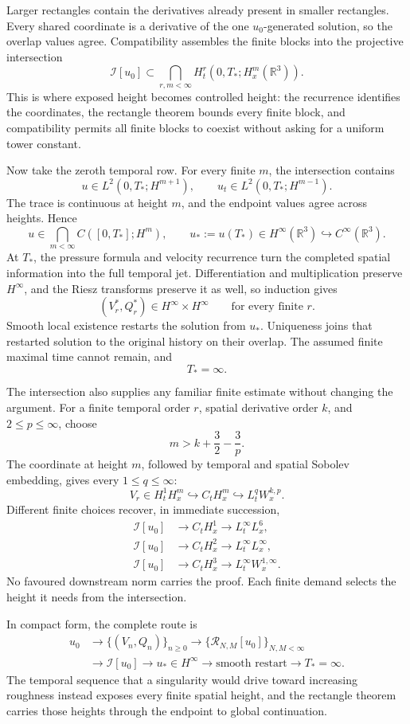 \documentclass[11pt]{article}
\begin{document}
Larger rectangles contain the derivatives already present in smaller rectangles. Every shared coordinate is a derivative of the one \(u_0\)-generated solution, so the overlap values agree. Compatibility assembles the finite blocks into the projective intersection
\[
\mathcal I[u_0]
\subset
\bigcap_{r,m<\infty}
H_t^r(0,T_*;H_x^m(\mathbb R^3)).
\]
This is where exposed height becomes controlled height: the recurrence identifies the coordinates, the rectangle theorem bounds every finite block, and compatibility permits all finite blocks to coexist without asking for a uniform tower constant.

Now take the zeroth temporal row. For every finite \(m\), the intersection contains
\[
u\in L^2(0,T_*;H^{m+1}),
\qquad
u_t\in L^2(0,T_*;H^{m-1}).
\]
The trace is continuous at height \(m\), and the endpoint values agree across heights. Hence
\[
u\in\bigcap_{m<\infty}C([0,T_*];H^m),
\qquad
u_*:=u(T_*)\in H^\infty(\mathbb R^3)
\hookrightarrow C^\infty(\mathbb R^3).
\]
At \(T_*\), the pressure formula and velocity recurrence turn the completed spatial information into the full temporal jet. Differentiation and multiplication preserve \(H^\infty\), and the Riesz transforms preserve it as well, so induction gives
\[
(V_r^*,Q_r^*)\in H^\infty\times H^\infty
\qquad
\text{for every finite }r.
\]
Smooth local existence restarts the solution from \(u_*\). Uniqueness joins that restarted solution to the original history on their overlap. The assumed finite maximal time cannot remain, and
\[
T_*=\infty.
\]

The intersection also supplies any familiar finite estimate without changing the argument. For a finite temporal order \(r\), spatial derivative order \(k\), and \(2\le p\le\infty\), choose
\[
m>k+\frac32-\frac3p.
\]
The coordinate at height \(m\), followed by temporal and spatial Sobolev embedding, gives every \(1\le q\le\infty\):
\[
V_r\in H_t^1H_x^m
\hookrightarrow C_tH_x^m
\hookrightarrow L_t^qW_x^{k,p}.
\]
Different finite choices recover, in immediate succession,
\[
\begin{aligned}
\mathcal I[u_0]&\longrightarrow C_tH_x^1
\longrightarrow L_t^\infty L_x^6,\\
\mathcal I[u_0]&\longrightarrow C_tH_x^2
\longrightarrow L_t^\infty L_x^\infty,\\
\mathcal I[u_0]&\longrightarrow C_tH_x^3
\longrightarrow L_t^\infty W_x^{1,\infty}.
\end{aligned}
\]
No favoured downstream norm carries the proof. Each finite demand selects the height it needs from the intersection.

In compact form, the complete route is
\[
\begin{aligned}
u_0
&\longrightarrow \{(V_n,Q_n)\}_{n\ge0}
\longrightarrow \{\mathcal R_{N,M}[u_0]\}_{N,M<\infty}\\
&\longrightarrow \mathcal I[u_0]
\longrightarrow u_*\in H^\infty
\longrightarrow \text{smooth restart}
\longrightarrow T_*=\infty.
\end{aligned}
\]
The temporal sequence that a singularity would drive toward increasing roughness instead exposes every finite spatial height, and the rectangle theorem carries those heights through the endpoint to global continuation.
\end{document}
